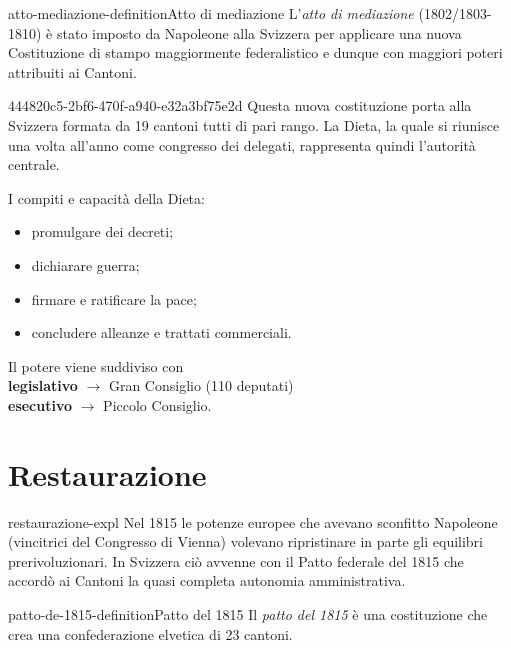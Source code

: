 \documentclass[preview]{standalone}
\begin{document}
\begin{snippetdefinition}{atto-mediazione-definition}{Atto di mediazione}
    L'\textit{atto di mediazione} (1802/1803-1810) è stato imposto da Napoleone alla Svizzera per
    applicare una nuova Costituzione di stampo maggiormente federalistico e
    dunque con maggiori poteri attribuiti ai Cantoni.
\end{snippetdefinition}

\begin{snippet}{444820c5-2bf6-470f-a940-e32a3bf75e2d}
    Questa nuova costituzione porta alla Svizzera formata da 19 cantoni tutti di pari rango.
    La Dieta, la quale si riunisce una volta all'anno come congresso dei delegati,
    rappresenta quindi l'autorità centrale.

    I compiti e capacità della Dieta:
    \begin{itemize}
        \item promulgare dei decreti;
        \item dichiarare guerra;
        \item firmare e ratificare la pace;
        \item concludere alleanze e trattati commerciali.
    \end{itemize}

    Il potere viene suddiviso con \\
    \textbf{legislativo} \(\rightarrow\) Gran Consiglio (110 deputati) \\
    \textbf{esecutivo} \(\rightarrow\) Piccolo Consiglio.
\end{snippet}


\section{Restaurazione}

\begin{snippet}{restaurazione-expl}
    Nel 1815 le potenze europee che avevano sconfitto Napoleone (vincitrici del Congresso di Vienna)
    volevano ripristinare in parte gli equilibri prerivoluzionari.
    In Svizzera ciò avvenne con il Patto federale del 1815 che
    accordò ai Cantoni la quasi completa autonomia amministrativa.
\end{snippet}

\begin{snippetdefinition}{patto-de-1815-definition}{Patto del 1815}
    Il \textit{patto del 1815} è una costituzione che crea una confederazione elvetica di 23 cantoni.
\end{snippetdefinition}
\end{document}
